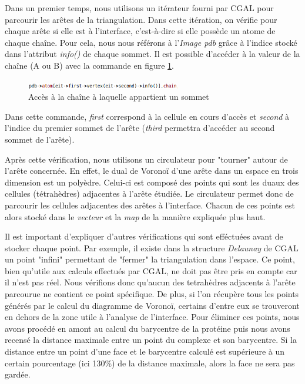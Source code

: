 Dans un premier temps, nous utilisons un itérateur fourni par CGAL pour parcourir
les arêtes de la triangulation. Dans cette itération, on vérifie pour chaque arête
si elle est à l'interface, c'est-à-dire
si elle possède un atome de chaque chaîne. Pour cela, nous nous référons à l'\textit{Image pdb}
grâce à l'indice stocké dans l'attribut \textit{info()} de chaque sommet. Il est possible
d'accéder à la valeur de la chaîne (A ou B) avec la commande en figure \ref{fig::access_chain}.
\begin{figure}[ht]
\centering
  \includegraphics[width=0.6\textwidth]{figures/access_chain.png}
  \caption{Accès à la chaîne à laquelle appartient un sommet}
  \label{fig::access_chain}
\end{figure}
Dans cette commande, \textit{first} correspond à la cellule en cours d'accès et
\textit{second} à l'indice du premier sommet de l'arête (\textit{third} permettra
d'accéder au second sommet de l'arête).

Après cette vérification, nous utilisons un circulateur pour "tourner" autour de l'arête
concernée. En effet, le dual de Voronoï d'une arête dans un espace en trois dimension
est un polyèdre. Celui-ci est composé des points qui sont les duaux des cellules (tétrahèdres)
adjacentes à l'arête étudiée. Le circulateur permet donc de parcourir les cellules adjacentes
des arêtes à l'interface. Chacun de ces points est alors stocké dans le \textit{vecteur} et
la \textit{map} de la manière expliquée plus haut.

Il est important d'expliquer d'autres vérifications qui sont efféctuées avant de stocker
chaque point. Par exemple, il existe dans la structure \textit{Delaunay} de CGAL
un point "infini" permettant de "fermer" la triangulation dans l'espace. Ce point, bien
qu'utile aux calculs effectués par CGAL, ne doit pas être pris en compte car il n'est pas réel.
Nous vérifions donc qu'aucun des tetrahèdres adjacents à l'arête parcourue ne contient
ce point spécifique. De plus, si l'on récupère tous les points générés par le calcul du
diagramme de Voronoï, certains d'entre eux se trouveront en dehors de la zone utile à l'analyse
de l'interface. Pour éliminer ces points, nous avons procédé en amont au calcul
du barycentre de la protéine puis nous avons recensé la distance maximale entre un point du complexe
et son barycentre. Si la distance entre un point d'une face et le barycentre calculé
est supérieure à un certain pourcentage (ici 130\%) de la distance maximale, alors
la face ne sera pas gardée.


